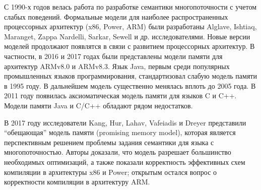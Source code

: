 
{\progress}
С 1990-х годов велась работа по
разработке семантики многопоточности с учетом слабых поведений.
Формальные модели для наиболее распространенных процессорных архитектур (x86, Power, ARM)
были разработаны Alglave, Ishtiaq, Maranget, Zappa Nardelli, Sarkar, Sewell и др. исследователями.
Новые версии моделей продолжают появлятся в связи с развитием процессорных архитектур.
В частности, в 2016 и 2017 годах были представлены модели памяти для архитектур ARMv8.0 и ARMv8.3.
Язык Java, первым среди популярных промышленных языков программирования,
стандартизовал слабую модель памяти в 1995 году. В дальнейшем модель существенно менялась вплоть до 2005 года.
В 2011 году появилась аксиоматическая модель памяти для языков C и C++.
Модели памяти Java и C/C++ обладают рядом недостатков.

В 2017 году исследователи Kang, Hur, Lahav, Vafeiadis и Dreyer
представили ``обещающая'' модель памяти (promising memory model), которая является перспективным
решением проблемы задания семантики для языка с многопоточностью. Авторы 
доказали, что модель разрешает большинство необходимых оптимизаций, а также показали корректность
эффективных схем компиляции в архитектуры x86 и Power; открытым остался вопрос о корректности компиляции
в архитектуру ARM.

